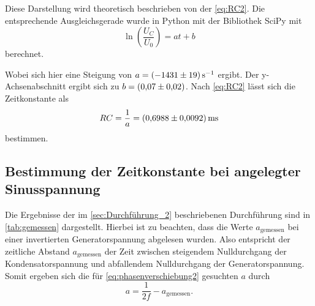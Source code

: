 Diese Darstellung wird theoretisch beschrieben von der \autoref{eq:RC2}.
Die entsprechende Ausgleichsgerade wurde in Python mit der Bibliothek SciPy\cite{scipy} mit
\begin{equation}
    \ln \left( \frac{U_C}{U_0} \right)=at+b
\end{equation}
berechnet.

Wobei sich hier eine Steigung von $a = \SI{-1431+-19}{\second}^{-1}$ ergibt.
Der y-Achsenabschnitt ergibt sich zu $b = \SI{0.07+-0.02}{}$.
Nach \autoref{eq:RC2} lässt sich die Zeitkonstante als 
\begin{equation}
    RC = \frac{1}{a} = \SI{0.6988+-0.0092}{\milli\second}
\end{equation}
bestimmen.

\subsection{Bestimmung der Zeitkonstante bei angelegter Sinusspannung}
\label{sec:Auswertung_Sinusspannung}

Die Ergebnisse der im \autoref{sec:Durchführung_2} beschriebenen Durchführung sind in \autoref{tab:gemessen} dargestellt. Hierbei ist zu beachten, dass die Werte $a_{\text{gemessen}}$ bei einer invertierten Generatorspannung abgelesen wurden. Also entspricht der zeitliche Abstand $a_{\text{gemessen}}$ der Zeit zwischen steigendem Nulldurchgang der Kondensatorspannung und abfallendem Nulldurchgang der Generatorspannung.
Somit ergeben sich die für \autoref{eq:phasenverschiebung2} gesuchten $a$ durch
\begin{equation}
    a = \frac{1}{2f} - a_{\text{gemessen}}.
\end{equation}

